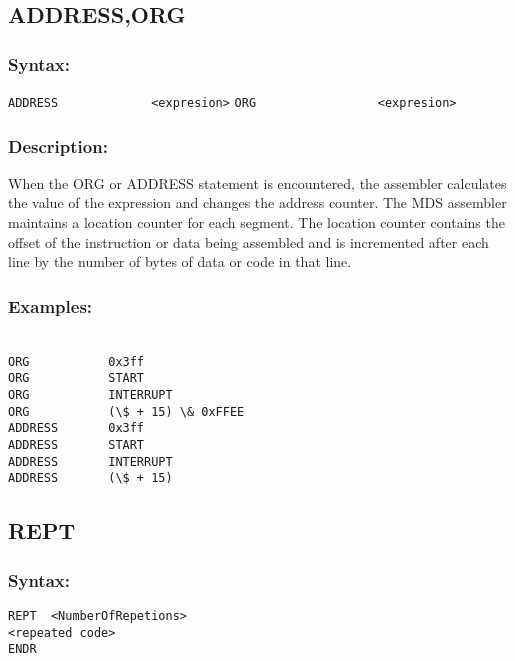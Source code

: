     \subsection{ADDRESS,ORG}
        \subsubsection{Syntax:}
            \verb'ADDRESS             <expresion>'
            \verb'ORG                 <expresion>'

        \subsubsection{Description:}
        When the ORG or ADDRESS statement is encountered, the assembler calculates the value of the expression and changes the address counter. The MDS assembler maintains a location counter for each segment. The location counter contains the offset of the instruction or data being assembled and is incremented after each line by the number of bytes of data or code in that line.

        \subsubsection{Examples:}
        {
            ~\\
            \usecodefont
            \verb'ORG           0x3ff'\\
            \verb'ORG           START'\\
            \verb'ORG           INTERRUPT'\\
            \verb'ORG           (\$ + 15) \& 0xFFEE'\\

            \verb'ADDRESS       0x3ff'\\
            \verb'ADDRESS       START'\\
            \verb'ADDRESS       INTERRUPT'\\
            \verb'ADDRESS       (\$ + 15)'\\
        }
    \subsection{REPT}
        \subsubsection{Syntax:}
            \verb'REPT  <NumberOfRepetions>'\\
            \verb'<repeated code>'\\
            \verb'ENDR'

